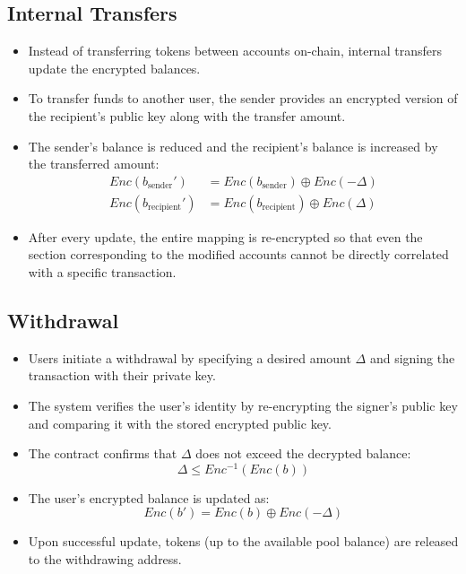 \documentclass[11pt]{article}
\begin{document}
\subsection{Internal Transfers}
\begin{itemize}
    \item Instead of transferring tokens between accounts on-chain, internal transfers update the encrypted balances.
    \item To transfer funds to another user, the sender provides an encrypted version of the recipient's public key along with the transfer amount.
    \item The sender's balance is reduced and the recipient's balance is increased by the transferred amount:
    \[
    \begin{aligned}
    Enc(b_{\text{sender}}') &= Enc(b_{\text{sender}}) \oplus Enc(-\Delta) \\
    Enc(b_{\text{recipient}}') &= Enc(b_{\text{recipient}}) \oplus Enc(\Delta)
    \end{aligned}
    \]
    \item After every update, the entire mapping is re-encrypted so that even the section corresponding to the modified accounts cannot be directly correlated with a specific transaction.
\end{itemize}

\subsection{Withdrawal}
\begin{itemize}
    \item Users initiate a withdrawal by specifying a desired amount \( \Delta \) and signing the transaction with their private key.
    \item The system verifies the user's identity by re-encrypting the signer's public key and comparing it with the stored encrypted public key.
    \item The contract confirms that \( \Delta \) does not exceed the decrypted balance:
    \[
    \Delta \leq Enc^{-1}(Enc(b))
    \]
    \item The user's encrypted balance is updated as:
    \[
    Enc(b') = Enc(b) \oplus Enc(-\Delta)
    \]
    \item Upon successful update, tokens (up to the available pool balance) are released to the withdrawing address.
\end{itemize}
\end{document}

